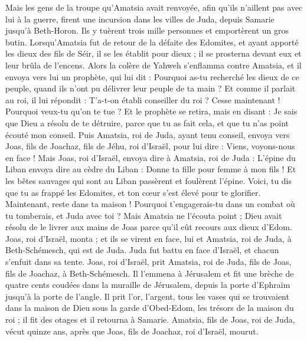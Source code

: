 \begin{multicols}{2}
Mais les gens de la troupe qu'Amatsia avait renvoyée, afin qu'ils n'aillent pas avec lui à la guerre, firent une incursion dans les villes de Juda, depuis Samarie jusqu'à Beth-Horon. Ils y tuèrent trois mille personnes et emportèrent un gros butin.
Lorsqu'Amatsia fut de retour de la défaite des Edomites, et ayant apporté les dieux des fils de Séir, il se les établit pour dieux ; il se prosterna devant eux et leur brûla de l'encens.
Alors la colère de Yahweh s'enflamma contre Amatsia, et il envoya vers lui un prophète, qui lui dit : Pourquoi as-tu recherché les dieux de ce peuple, quand ils n'ont pu délivrer leur peuple de ta main ?
Et comme il parlait au roi, il lui répondit : T'a-t-on établi conseiller du roi ? Cesse maintenant ! Pourquoi veux-tu qu'on te tue ? Et le prophète se retira, mais en disant : Je sais que Dieu a résolu de te détruire, parce que tu as fait cela, et que tu n'as point écouté mon conseil.
Puis Amatsia, roi de Juda, ayant tenu conseil, envoya vers Joas, fils de Joachaz, fils de Jéhu, roi d'Israël, pour lui dire : Viens, voyons-nous en face !
Mais Joas, roi d'Israël, envoya dire à Amatsia, roi de Juda : L'épine du Liban envoya dire au cèdre du Liban : Donne ta fille pour femme à mon fils ! Et les bêtes sauvages qui sont au Liban passèrent et foulèrent l'épine.
Voici, tu dis que tu as frappé les Edomites, et ton cœur s'est élevé pour te glorifier. Maintenant, reste dans ta maison ! Pourquoi t'engagerais-tu dans un combat où tu tomberais, et Juda avec toi ?
Mais Amatsia ne l'écouta point ; Dieu avait résolu de le livrer aux mains de Joas parce qu'il eût recours aux dieux d'Edom.
Joas, roi d'Israël, monta ; et ils se virent en face, lui et Amatsia, roi de Juda, à Beth-Schémesch, qui est de Juda.
Juda fut battu en face d'Israël, et chacun s'enfuit dans sa tente.
Joas, roi d'Israël, prit Amatsia, roi de Juda, fils de Joas, fils de Joachaz, à Beth-Schémesch. Il l'emmena à Jérusalem et fit une brèche de quatre cents coudées dans la muraille de Jérusalem, depuis la porte d'Ephraïm jusqu'à la porte de l'angle.
Il prit l'or, l'argent, tous les vases qui se trouvaient dans la maison de Dieu sous la garde d'Obed-Edom, les trésors de la maison du roi ; il fit des otages et il retourna à Samarie.
Amatsia, fils de Joas, roi de Juda, vécut quinze ans, après que Joas, fils de Joachaz, roi d'Israël, mourut.

\end{multicols}
